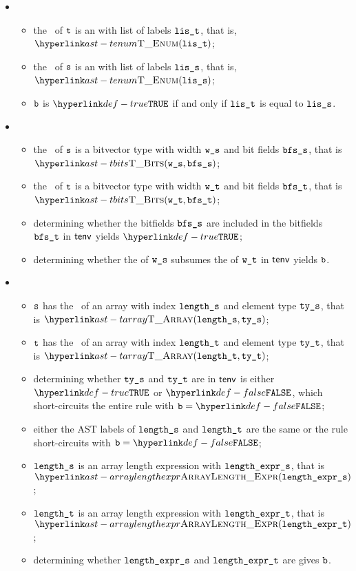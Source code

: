 \begin{itemize}
\item {}
  \begin{itemize}
  \item the \underlyingtype\ of $\texttt{t}$ is an \enumerationtypeterm{} with list of labels $\texttt{lis\_t}$, that is, $\TEnum(\vlit)$;
  \item the \underlyingtype\ of $\texttt{s}$ is an \enumerationtypeterm{} with list of labels $\texttt{lis\_s}$, that is, $\TEnum(\vlis)$;
  \item $\texttt{b}$ is $\True$ if and only if $\texttt{lis\_t}$ is equal to $\texttt{lis\_s}$.
  \end{itemize}

\item {}
  \begin{itemize}
  \item the \underlyingtype\ of $\texttt{s}$ is a bitvector type with width $\texttt{w\_s}$ and bit fields $\texttt{bfs\_s}$, that is $\TBits(\ws, \bfss)$;
  \item the \underlyingtype\ of $\texttt{t}$ is a bitvector type with width $\texttt{w\_t}$ and bit fields $\texttt{bfs\_t}$, that is $\TBits(\wt, \bfst)$;
  \item determining whether the bitfields $\texttt{bfs\_s}$ are included in the bitfields $\texttt{bfs\_t}$ in $\textsf{tenv}$ yields $\True$\ProseOrTypeError;
  \item determining whether the \symbolicdomain{} of $\texttt{w\_s}$ subsumes the \symbolicdomain{} of $\texttt{w\_t}$ in $\textsf{tenv}$ yields $\texttt{b}$.
  \end{itemize}

\item {}
  \begin{itemize}
  \item $\texttt{s}$ has the \underlyingtype\ of an array with index $\texttt{length\_s}$ and element type $\texttt{ty\_s}$, that is $\TArray(\vlengths, \vtys)$;
  \item $\texttt{t}$ has the \underlyingtype\ of an array with index $\texttt{length\_t}$ and element type $\texttt{ty\_t}$, that is $\TArray(\vlengtht, \vtyt)$;
  \item determining whether $\texttt{ty\_s}$ and $\texttt{ty\_t}$ are \equivalenttypesterm{} in $\textsf{tenv}$ is either $\True$
  or $\False$, which short-circuits the entire rule with $\vb=\False$;
  \item either the AST labels of $\texttt{length\_s}$ and $\texttt{length\_t}$ are the same or the rule short-circuits with $\vb=\False$;
  \item $\texttt{length\_s}$ is an array length expression with $\texttt{length\_expr\_s}$, that is \\ $\ArrayLengthExpr(\vlengthexprs)$;
  \item $\texttt{length\_t}$ is an array length expression with $\texttt{length\_expr\_t}$, that is \\ $\ArrayLengthExpr(\vlengthexprt)$;
  \item determining whether $\texttt{length\_expr\_s}$ and $\texttt{length\_expr\_t}$ are \equivalentexprsterm{} gives $\texttt{b}$.
  \end{itemize}


\end{itemize}
